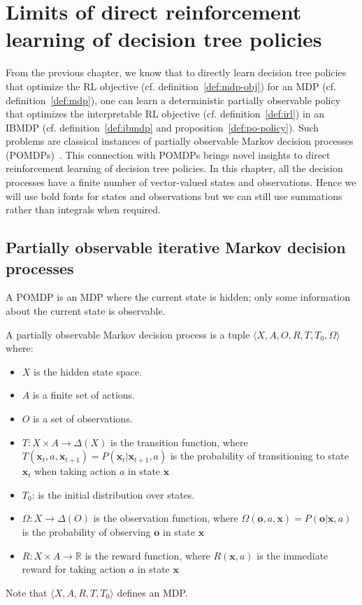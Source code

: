 \chapter{Limits of direct reinforcement learning of decision tree policies}\label{sec:pomdp}

From the previous chapter, we know that to directly learn decision tree policies that optimize the RL objective (cf. definition~\ref{def:mdp-obj}) for an MDP (cf. definition~\ref{def:mdp}), one can learn a deterministic partially observable policy that optimizes the interpretable RL objective (cf. definition~\ref{def:irl}) in an IBMDP (cf. definition~\ref{def:ibmdp} and proposition~\ref{def:po-policy}).
Such problems are classical instances of partially observable Markov decision processes (POMDPs)~\cite{POMDP,chap2}.
This connection with POMDPs brings novel insights to direct reinforcement learning of decision tree policies. 
In this chapter, all the decision processes have a finite number of vector-valued states and observations.
Hence we will use bold fonts for states and observations but we can still use summations rather than integrals when required.

\section{Partially observable iterative Markov decision processes}\label{sec:poibmdp}
A POMDP is an MDP where the current state is hidden; only some information about the current state is observable.

\begin{definition}\label{def:pomdp}
A partially observable Markov decision process is a tuple $\langle X, A, O, R, T, T_0, \Omega\rangle$ where:
\begin{itemize}
    \item $X$ is the hidden state space.
    \item $A$ is a finite set of actions.
    \item $O$ is a set of observations.
    \item $T: X \times A \rightarrow \Delta(X)$ is the transition function, where $T(\boldsymbol{x}_t, a, \boldsymbol{x}_{t+1}) = P(\boldsymbol{x}_t|\boldsymbol{x}_{t+1}, a)$ is the probability of transitioning to state $\boldsymbol{x}_{t}$ when taking action $a$ in state $\boldsymbol{x}$
    \item $T_0$: is the initial distribution over states. 
    \item $\Omega: X \rightarrow \Delta(O)$ is the observation function, where $\Omega(\boldsymbol{o}, a, \boldsymbol{x}) = P(\boldsymbol{o}|\boldsymbol{x}, a)$ is the probability of observing $\boldsymbol{o}$ in state $\boldsymbol{x}$
    \item $R: X \times A \rightarrow \mathbb{R}$ is the reward function, where $R(\boldsymbol{x}, a)$ is the immediate reward for taking action $a$ in state $\boldsymbol{x}$
\end{itemize}
Note that $\langle X, A, R, T, T_0 \rangle$ defines an MDP.
\end{definition}

